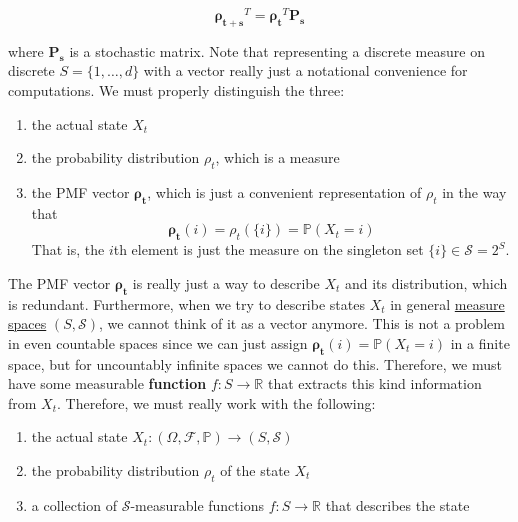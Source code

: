       \begin{equation}
        \boldsymbol{\rho_{t + s}}^T = \boldsymbol{\rho_{t}}^T \boldsymbol{P_s}
      \end{equation}

    where $\boldsymbol{P_s}$ is a stochastic matrix. Note that representing a discrete measure on discrete $S = \{1, \ldots, d\}$ with a vector really just a notational convenience for computations. We must properly distinguish the three: 

    \begin{enumerate}
      \item the actual state $X_t$ 
      \item the probability distribution $\rho_t$, which is a measure 
      \item the PMF vector $\boldsymbol{\rho_t}$, which is just a convenient representation of $\rho_t$ in the way that 
      \begin{equation}
        \boldsymbol{\rho_t} (i) = \rho_t (\{i\}) = \mathbb{P}(X_t = i)
      \end{equation}
      That is, the $i$th element is just the measure on the singleton set $\{i\} \in \mathcal{S} = 2^S$. 
    \end{enumerate}

    The PMF vector $\boldsymbol{\rho_t}$ is really just a way to describe $X_t$ and its distribution, which is redundant. Furthermore, when we try to describe states $X_t$ in general \hyperref[mt-def:measure-space]{measure spaces} $(S, \mathcal{S})$, we cannot think of it as a vector anymore. This is not a problem in even countable spaces since we can just assign $\boldsymbol{\rho_t} (i) = \mathbb{P}(X_t = i)$ in a finite space, but for uncountably infinite spaces we cannot do this. Therefore, we must have some measurable \textbf{function} $f: S \rightarrow \mathbb{R}$ that extracts this kind information from $X_{t}$. Therefore, we must really work with the following: 

    \begin{enumerate}
      \item the actual state $X_t: (\Omega, \mathcal{F}, \mathbb{P}) \to (S, \mathcal{S})$ 
      \item the probability distribution $\rho_t$ of the state $X_t$ 
      \item a collection of $\mathcal{S}$-measurable functions $f: S \to \mathbb{R}$ that describes the state 
    \end{enumerate}

